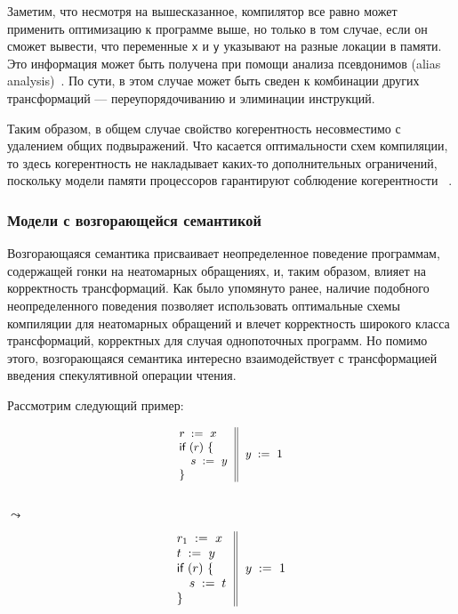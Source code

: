Заметим, что несмотря на вышесказанное, компилятор 
все равно может применить оптимизацию \CSE к программе выше, 
но только в том случае, если он сможет вывести, что переменные \texttt{x} и \texttt{y} 
указывают на разные локации в памяти. 
Это информация может быть получена при помощи 
анализа псевдонимов (alias analysis)~\cite{Diwan-al:PLDI1998}.
По сути, в этом случае \CSE может быть сведен к 
комбинации других трансформаций --- переупорядочиванию и элиминации инструкций. 

Таким образом, в общем случае свойство когерентность
несовместимо с удалением общих подвыражений. 
Что касается оптимальности схем компиляции, 
то здесь когерентность не накладывает каких-то 
дополнительных ограничений, 
поскольку  модели памяти процессоров  
гарантируют соблюдение когерентности%
~\cite{Alglave-al:TOPLAS14, Sarkar-al:PLDI11, Sewell-al:CACM10, Lahav-al:PLDI17}. 

\subsubsection{Модели с возгорающейся семантикой}
\label{sec:analysis:ub}

Возгорающаяся семантика присваивает 
неопределенное поведение программам, содержащей 
гонки на неатомарных обращениях, и, таким образом, влияет на корректность трансформаций. 
Как было упомянуто ранее, наличие подобного 
неопределенного поведения позволяет использовать
оптимальные схемы компиляции для неатомарных обращений
и влечет корректность широкого класса трансформаций, 
корректных для случая однопоточных программ. 
Но помимо этого, возгорающаяся семантика 
интересно взаимодействует с трансформацией
введения спекулятивной операции чтения. 

Рассмотрим следующий пример:

\begin{minipage}{0.43\linewidth}
\begin{equation*}
\small
\inarrII{
  \readInst{}{r}{x}      \\
  \kw{if} {(r)} ~\{      \\
  \quad\readInst{}{s}{y} \\
  \}

}{
  \writeInst{}{y}{1}       \\
}
\label{ex:sliA}
\end{equation*}
\end{minipage}\hfill%
\begin{minipage}{0.09\linewidth}
\Large~\\ $\leadsto$
\end{minipage}\hfill%
\begin{minipage}{0.43\linewidth}
\begin{equation*}
\inarrII{
  \readInst{}{r_1}{x}      \\
  \readInst{}{t}{y}        \\
  \kw{if} {(r)} ~\{        \\
  \quad\assignInst{s}{t}   \\
  \}

}{
  \writeInst{}{y}{1}       \\
}
\label{ex:sliB}
\end{equation*}
\end{minipage}
 
